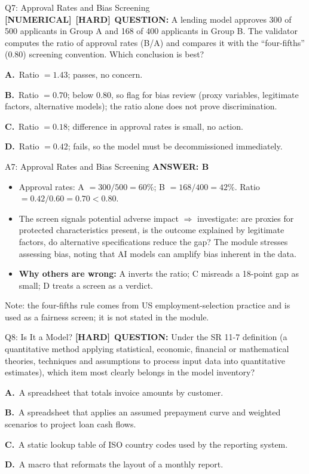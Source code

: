 \documentclass[8pt]{beamer}
\newcommand{\fs}{\fontsize{10}{12}\selectfont}
\newcommand{\opts}[4]{\par\vspace{0.12cm}\noindent\textbf{A.}~#1\par\vspace{0.08cm}\noindent\textbf{B.}~#2\par\vspace{0.08cm}\noindent\textbf{C.}~#3\par\vspace{0.08cm}\noindent\textbf{D.}~#4\par}
\newcommand{\ans}[1]{\textcolor{myblue}{\textbf{ANSWER: #1}}}
\newcommand{\numtag}{\textcolor{mypurple}{\textbf{[NUMERICAL]}}}
\newcommand{\hard}{\textcolor{myorange}{\textbf{[HARD]}}}
\begin{document}
\begin{frame}[t]{Q7: Approval Rates and Bias Screening}
\fs
\numtag\ \hard\ \textbf{QUESTION:} A lending model approves 300 of 500 applicants in Group A and 168 of 400 applicants in Group B. The validator computes the ratio of approval rates (B/A) and compares it with the ``four-fifths'' (0.80) screening convention. Which conclusion is best?
\opts{Ratio $=1.43$; passes, no concern.}
{Ratio $=0.70$; below 0.80, so flag for bias review (proxy variables, legitimate factors, alternative models); the ratio alone does not prove discrimination.}
{Ratio $=0.18$; difference in approval rates is small, no action.}
{Ratio $=0.42$; fails, so the model must be decommissioned immediately.}
\end{frame}

\begin{frame}[t]{A7: Approval Rates and Bias Screening}
\fs
\ans{B}
\begin{itemize}
\item Approval rates: A $=300/500=60\%$; B $=168/400=42\%$. Ratio $=0.42/0.60=\mathbf{0.70}<0.80$.
\item The screen signals potential adverse impact $\Rightarrow$ investigate: are proxies for protected characteristics present, is the outcome explained by legitimate factors, do alternative specifications reduce the gap? The module stresses assessing bias, noting that AI models can amplify bias inherent in the data.
\item \textbf{Why others are wrong:} A inverts the ratio; C misreads a 18-point gap as small; D treats a screen as a verdict.
\end{itemize}
\textcolor{mygray}{Note: the four-fifths rule comes from US employment-selection practice and is used as a fairness screen; it is not stated in the module.}
\end{frame}


\begin{frame}[t]{Q8: Is It a Model?}
\fs
\hard\ \textbf{QUESTION:} Under the SR 11-7 definition (a quantitative method applying statistical, economic, financial or mathematical theories, techniques and assumptions to process input data into quantitative estimates), which item most clearly belongs in the model inventory?
\opts{A spreadsheet that totals invoice amounts by customer.}
{A spreadsheet that applies an assumed prepayment curve and weighted scenarios to project loan cash flows.}
{A static lookup table of ISO country codes used by the reporting system.}
{A macro that reformats the layout of a monthly report.}
\end{frame}
\end{document}
